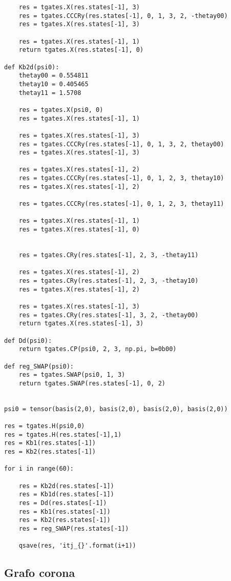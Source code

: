 \begin{verbatim}
    res = tgates.X(res.states[-1], 3)
    res = tgates.CCCRy(res.states[-1], 0, 1, 3, 2, -thetay00)
    res = tgates.X(res.states[-1], 3)

    res = tgates.X(res.states[-1], 1)
    return tgates.X(res.states[-1], 0)

def Kb2d(psi0):
    thetay00 = 0.554811
    thetay10 = 0.405465
    thetay11 = 1.5708

    res = tgates.X(psi0, 0)
    res = tgates.X(res.states[-1], 1)

    res = tgates.X(res.states[-1], 3)
    res = tgates.CCCRy(res.states[-1], 0, 1, 3, 2, thetay00)
    res = tgates.X(res.states[-1], 3)

    res = tgates.X(res.states[-1], 2)
    res = tgates.CCCRy(res.states[-1], 0, 1, 2, 3, thetay10)
    res = tgates.X(res.states[-1], 2)

    res = tgates.CCCRy(res.states[-1], 0, 1, 2, 3, thetay11)

    res = tgates.X(res.states[-1], 1)
    res = tgates.X(res.states[-1], 0)


    res = tgates.CRy(res.states[-1], 2, 3, -thetay11)

    res = tgates.X(res.states[-1], 2)
    res = tgates.CRy(res.states[-1], 2, 3, -thetay10)
    res = tgates.X(res.states[-1], 2)

    res = tgates.X(res.states[-1], 3)
    res = tgates.CRy(res.states[-1], 3, 2, -thetay00)
    return tgates.X(res.states[-1], 3)

def Dd(psi0):
    return tgates.CP(psi0, 2, 3, np.pi, b=0b00)

def reg_SWAP(psi0):
    res = tgates.SWAP(psi0, 1, 3)
    return tgates.SWAP(res.states[-1], 0, 2)


psi0 = tensor(basis(2,0), basis(2,0), basis(2,0), basis(2,0))

res = tgates.H(psi0,0)
res = tgates.H(res.states[-1],1)
res = Kb1(res.states[-1])
res = Kb2(res.states[-1])

for i in range(60):
    
    res = Kb2d(res.states[-1])
    res = Kb1d(res.states[-1])
    res = Dd(res.states[-1])
    res = Kb1(res.states[-1])
    res = Kb2(res.states[-1])
    res = reg_SWAP(res.states[-1])
    
    qsave(res, 'itj_{}'.format(i+1))
\end{verbatim}


\subsection{Grafo corona}

